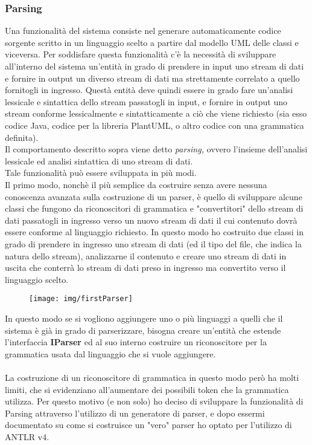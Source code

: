\documentclass{article}
\begin{document}
  \subsubsection{Parsing}
  Una funzionalità del sistema consiste nel generare automaticamente codice sorgente scritto in un linguaggio scelto a partire dal modello UML delle
  classi e viceversa. Per soddisfare questa funzionalità c'è la necessità di sviluppare all'interno del sistema un'entità in grado di prendere in input uno stream di dati
  e fornire in output un diverso stream di dati ma strettamente correlato a quello fornitogli in ingresso. Questà entità deve quindi essere in grado fare
  un'analisi lessicale e sintattica dello stream passatogli in input, e fornire in output uno stream conforme lessicalmente e sintatticamente a ciò che viene
  richiesto (sia esso codice Java, codice per la libreria PlantUML, o altro codice con una grammatica definita).\\
  Il comportamento descritto sopra viene detto \textit{parsing,} ovvero l'insieme dell'analisi lessicale ed analisi sintattica di uno stream di dati.\\
  Tale funzionalità può essere sviluppata in più modi.\\Il primo modo, nonchè il più
  semplice da costruire senza avere nessuna conoscenza avanzata sulla costruzione di un parser, è quello di sviluppare alcune classi che fungono da riconoscitori di
  grammatica e "convertitori" dello stream di dati passatogli in ingresso verso un nuovo stream di dati il cui contenuto dovrà essere conforme al linguaggio richiesto. In questo
  modo ho costruito due classi in grado di prendere in ingresso uno stream di dati (ed il tipo del file, che indica la natura dello stream),
  analizzarne il contenuto e creare uno stream di dati in uscita che conterrà lo stream di dati preso in ingresso ma convertito verso il linguaggio scelto.
  \begin{figure}[H]
    \centering
    \texttt{[image: img/firstParser]}
  \end{figure}
  In questo modo se si vogliono aggiungere uno o più linguaggi a quelli che il sistema è già in grado di parserizzare, bisogna creare un'entità
  che estende l'interfaccia \textbf{IParser} ed al suo interno costruire un riconoscitore per la grammatica usata dal linguaggio che si vuole aggiungere.\\
  \\La costruzione di un riconoscitore di grammatica in questo modo però ha molti limiti, che si evidenziano all'aumentare dei possibili token che la grammatica
  utilizza. Per questo motivo (e non solo) ho deciso di sviluppare la funzionalità di Parsing attraverso l'utilizzo di un generatore di parser, e dopo essermi
  documentato su come si costruisce un "vero" parser ho optato per l'utilizzo di ANTLR v4.
\end{document}
